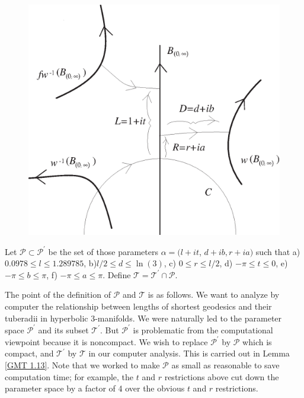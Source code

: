 \begin{figure}[h]\label{GMT fig 1.1}
	\centering
	\includegraphics[scale=0.500]{fig1.1}
\end{figure}

\begin{definition}\label{GMT 1.12}
Let ${\mathcal P}\subset{\mathcal P}^{\prime}$ be the set of those parameters $\alpha
= (l+it$, $d+ib, r+ia)$ such
that
 a)       $0.0978\le l \le 1.289785$,
 b)\enspace      $l/2 \le d\le \ln(3)$,
 c) \enspace   $0\le r \le l/2$,
 d) \enspace      $-\pi \le t \le 0$,
 e) \enspace	$-\pi \le b \le \pi$,
 f) \enspace	$-\pi \le a \le \pi$.
\noindent 
Define ${\mathcal T}={\mathcal T}^{\prime}\cap {\mathcal P}.$
\end{definition}

The point of the definition of ${\mathcal P}$ and ${\mathcal T}$ is as follows.  We want to analyze by computer the relationship between lengths of shortest geodesics  and their tuberadii in hyperbolic $3$-manifolds.  We were naturally led to the parameter space 
${\mathcal P}^{\prime}$ and its subset ${\mathcal T}^{\prime}.$  But 
${\mathcal P}^{\prime}$ is problematic from the computational viewpoint because it is noncompact.  We wish to replace 
${\mathcal P}^{\prime}$ by ${\mathcal P}$ which is compact, and 
${\mathcal T}^{\prime}$ by ${\mathcal T}$ in our computer analysis.  This is carried out in Lemma \ref{GMT 1.13}.  Note that we worked to make ${\mathcal P}$ as small as reasonable to save computation time;  for example, the $t$ and $r$ restrictions above cut down the parameter space by a factor of 4 over the obvious $t$ and $r$ restrictions. 

